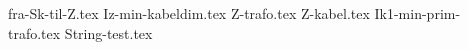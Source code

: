 \usepackage[utf8]{inputenc}%
\usepackage{amsmath}%
\usepackage{mathtools}%
\usepackage{icomma}%
\usepackage{siunitx}%
\usepackage{fp}%
\usepackage{xstring}%
\usepackage{import}
\usepackage{listofitems}


{fra-Sk-til-Z.tex}
{Iz-min-kabeldim.tex}
{Z-trafo.tex}
{Z-kabel.tex}
{Ik1-min-prim-trafo.tex}
{String-test.tex}
